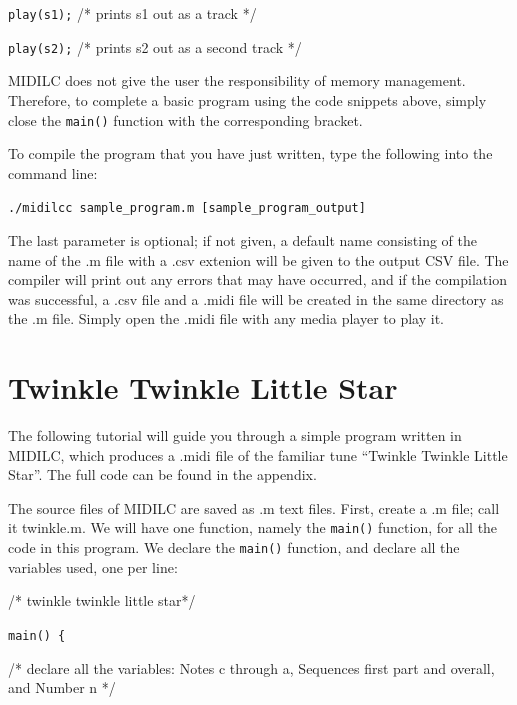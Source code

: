 \documentclass[12pt,A4]{book}
\begin{document}
\vspace{5 mm}

\verb|play(s1);| /* prints s1 out as a track */

\verb|play(s2);| /* prints s2 out as a second track */

\vspace{5 mm}

\noindent MIDILC does not give the user the responsibility of memory management. Therefore, to complete a basic program using the code snippets above, simply close the \verb|main()| function with the corresponding bracket.

To compile the program that you have just written, type the following into the command line:

\vspace{5 mm}

\verb|./midilcc sample_program.m [sample_program_output]|

\vspace{5 mm}

\noindent The last parameter is optional; if not given, a default name consisting of the name of the .m file with a .csv extenion will be given to the output CSV file. The compiler will print out any errors that may have occurred, and if the compilation was successful, a .csv file and a .midi file will be created in the same directory as the .m file. Simply open the .midi file with any media player to play it.
\section{Twinkle Twinkle Little Star}

\indent The following tutorial will guide you through a simple program written in MIDILC, which produces a .midi file of the familiar tune “Twinkle Twinkle Little Star”. The full code can be found in the appendix.
	
The source files of MIDILC are saved as .m text files. First, create a .m file; call it twinkle.m. We 
will have one function, namely the \verb|main()| function, for all the code in this program. We declare the 
\verb|main()| function, and declare all the variables used, one per line:	

\vspace{5 mm}

	/* twinkle twinkle little star*/

\verb|main() {|

		/* declare all the variables: Notes c through a, Sequences
		first part and overall, and Number n */
\end{document}
